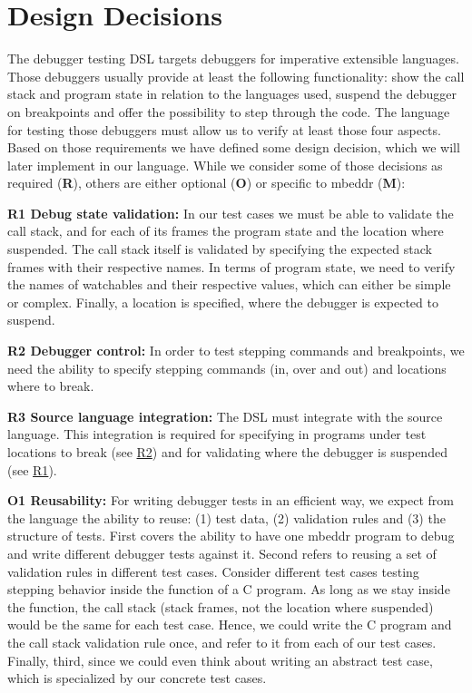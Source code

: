 \section{Design Decisions}

The debugger testing \ac{DSL} targets debuggers for imperative extensible
languages.
Those debuggers usually provide at least the following functionality:
show the call stack and program state in relation to the languages used, 
suspend the debugger on breakpoints and offer the possibility to 
step through the code. The language for testing those debuggers must allow us to
verify at least those four aspects. 
Based on those requirements we have defined
some design decision, which we will later implement in our language. While we consider 
some of those decisions as required (\textbf{R}), others are either optional
(\textbf{O}) or specific to mbeddr (\textbf{M}):


\textbf{\label{R1}R1 Debug state validation:} In our test cases we
must be able to validate the call stack, and for each of its frames 
the program state and the location where suspended. 
The call stack itself is validated by specifying the expected stack
frames with their respective names. In terms of program state, we need to verify
the names of watchables and their respective values, which can either be simple
or complex. 
Finally, a location is specified, where the debugger is expected to suspend.

\textbf{\label{R2}R2 Debugger control:} In order to test stepping
commands and breakpoints, we need the ability to specify stepping commands
(in, over and out) and locations where to break.

\textbf{\label{R3}R3 Source language integration:} The
\ac{DSL} must integrate with the source language.
This integration is required for specifying in programs under test
locations to break (see \hyperref[R2]{R2}) and for validating where the debugger is suspended
(see \hyperref[R1]{R1}).

\textbf{\label{O1}O1 Reusability:} For writing debugger tests in
an efficient way, we expect from the language the ability to reuse: (1) test
data, (2) validation rules and (3) the structure of tests. First covers the ability to
have one mbeddr program to debug and write different debugger tests against
it. Second refers to reusing a set of validation rules in different test cases.
Consider different test cases testing stepping behavior inside the  
function of a C program.
As long as we stay inside the function, the call stack (stack frames, not the
location where suspended) would be the same for each test case. Hence, we could
write the C program and the call stack validation rule once, and refer to it
from each of our test cases. Finally, third, since we could even think about
writing an abstract test case, which is specialized by our concrete test cases.

